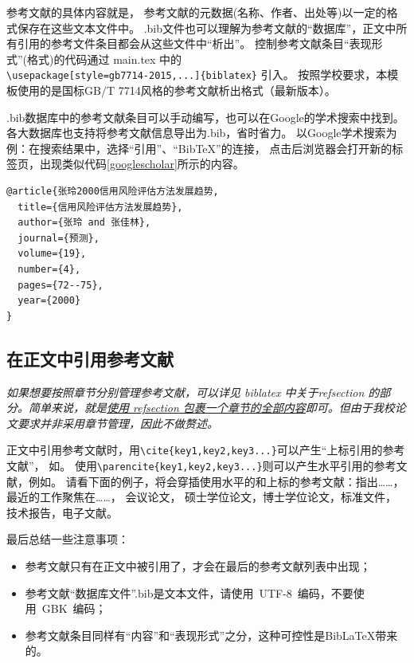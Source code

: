 参考文献的具体内容就是，
参考文献的元数据(名称、作者、出处等)以一定的格式保存在这些文本文件中。
.bib文件也可以理解为参考文献的``数据库''，正文中所有引用的参考文件条目都会从这些文件中``析出''。
控制参考文献条目``表现形式''(格式)的代码通过 main.tex 中的 \\ \verb|\usepackage[style=gb7714-2015,...]{biblatex}| 引入。
按照学校要求，本模板使用的是国标GB/T 7714风格的参考文献析出格式（最新版本）。

.bib数据库中的参考文献条目可以手动编写，也可以在Google的学术搜索中找到。
各大数据库也支持将参考文献信息导出为.bib，省时省力。
以Google学术搜索为例：在搜索结果中，选择``引用''、``BibTeX''的连接，
点击后浏览器会打开新的标签页，出现类似代码\ref{googlescholar}所示的内容。

\begin{lstlisting}[caption={从Google Scholar找到的，但并不规范的.bib条目}, label=googlescholar, float, escapeinside="", numbers=none]
@article{张玲2000信用风险评估方法发展趋势,
  title={信用风险评估方法发展趋势},
  author={张玲 and 张佳林},
  journal={预测},
  volume={19},
  number={4},
  pages={72--75},
  year={2000}
}
\end{lstlisting}

\subsection{在正文中引用参考文献}

\textit{如果想要按照章节分别管理参考文献，可以详见 biblatex 中关于refsection 的部分。简单来说，就是\href{https://github.com/BITNP/BIThesis/discussions/435}{使用 refsection 包裹一个章节的全部内容}即可。但由于我校论文要求并非采用章节管理，因此不做赘述。}

正文中引用参考文献时\cite{Jiang2005Size}，用\verb+\cite{key1,key2,key3...}+可以产生“上标引用的参考文献”，
如\cite{Meta_CN,chen2007act,DPMG}。
使用\verb+\parencite{key1,key2,key3...}+则可以产生水平引用的参考文献，例如\parencite{JohnD,zhubajie,IEEE-1363}。
请看下面的例子，将会穿插使用水平的和上标的参考文献：\parencite{Meta_CN,JohnD,IEEE-1363}指出……，最近的工作\cite{chen2007act,chen2007ewi}聚焦在……，
会议论文\cite{DPMG,kocher99,cnproceed}，
硕士学位论文\cite{zhubajie,metamori2004}，博士学位论文\cite{shaheshang,FistSystem01,bai2008}，标准文件\cite{IEEE-1363}，技术报告\cite{NPB2}，电子文献\cite{xiaoyu2001, CHRISTINE1998}。

最后总结一些注意事项：
\begin{itemize}
\item  参考文献只有在正文中被引用了，才会在最后的参考文献列表中出现；
\item  参考文献``数据库文件''.bib是文本文件，请使用~UTF-8~编码，不要使用~GBK~编码；
\item  参考文献条目同样有“内容”和“表现形式”之分，这种可控性是BibLaTeX带来的。
\end{itemize}


